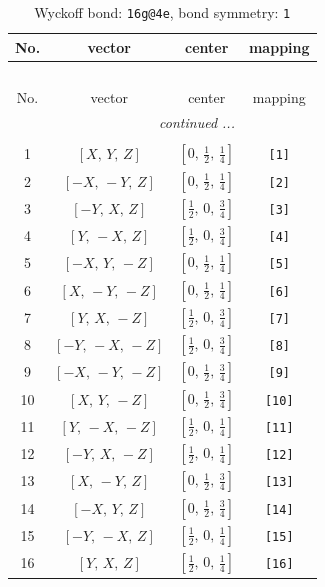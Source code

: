 \documentclass[fleqn,8pt]{jsarticle}
\begin{document}
\begin{longtable}{cccc}
\caption{Wyckoff bond: {\tt 16g@4e}, bond symmetry: {\tt 1}}
 \\
 \hline \hline
No. & vector & center & mapping \\ \hline \endfirsthead

\multicolumn{3}{l}{\tablename\ \thetable{}} \\
 \hline \hline
No. & vector & center & mapping \\ \hline \endhead

 \hline \hline
\multicolumn{3}{r}{\footnotesize\it continued ...} \\ \endfoot

 \hline \hline
\multicolumn{3}{r}{} \\ \endlastfoot

1 & $\left[ X,\, Y,\, Z \right]$ & $\left[ 0,\, \frac{1}{2},\, \frac{1}{4} \right]$ & {\tt [1]} \\ \hline
2 & $\left[ - X,\, - Y,\, Z \right]$ & $\left[ 0,\, \frac{1}{2},\, \frac{1}{4} \right]$ & {\tt [2]} \\ \hline
3 & $\left[ - Y,\, X,\, Z \right]$ & $\left[ \frac{1}{2},\, 0,\, \frac{3}{4} \right]$ & {\tt [3]} \\ \hline
4 & $\left[ Y,\, - X,\, Z \right]$ & $\left[ \frac{1}{2},\, 0,\, \frac{3}{4} \right]$ & {\tt [4]} \\ \hline
5 & $\left[ - X,\, Y,\, - Z \right]$ & $\left[ 0,\, \frac{1}{2},\, \frac{1}{4} \right]$ & {\tt [5]} \\ \hline
6 & $\left[ X,\, - Y,\, - Z \right]$ & $\left[ 0,\, \frac{1}{2},\, \frac{1}{4} \right]$ & {\tt [6]} \\ \hline
7 & $\left[ Y,\, X,\, - Z \right]$ & $\left[ \frac{1}{2},\, 0,\, \frac{3}{4} \right]$ & {\tt [7]} \\ \hline
8 & $\left[ - Y,\, - X,\, - Z \right]$ & $\left[ \frac{1}{2},\, 0,\, \frac{3}{4} \right]$ & {\tt [8]} \\ \hline
9 & $\left[ - X,\, - Y,\, - Z \right]$ & $\left[ 0,\, \frac{1}{2},\, \frac{3}{4} \right]$ & {\tt [9]} \\ \hline
10 & $\left[ X,\, Y,\, - Z \right]$ & $\left[ 0,\, \frac{1}{2},\, \frac{3}{4} \right]$ & {\tt [10]} \\ \hline
11 & $\left[ Y,\, - X,\, - Z \right]$ & $\left[ \frac{1}{2},\, 0,\, \frac{1}{4} \right]$ & {\tt [11]} \\ \hline
12 & $\left[ - Y,\, X,\, - Z \right]$ & $\left[ \frac{1}{2},\, 0,\, \frac{1}{4} \right]$ & {\tt [12]} \\ \hline
13 & $\left[ X,\, - Y,\, Z \right]$ & $\left[ 0,\, \frac{1}{2},\, \frac{3}{4} \right]$ & {\tt [13]} \\ \hline
14 & $\left[ - X,\, Y,\, Z \right]$ & $\left[ 0,\, \frac{1}{2},\, \frac{3}{4} \right]$ & {\tt [14]} \\ \hline
15 & $\left[ - Y,\, - X,\, Z \right]$ & $\left[ \frac{1}{2},\, 0,\, \frac{1}{4} \right]$ & {\tt [15]} \\ \hline
16 & $\left[ Y,\, X,\, Z \right]$ & $\left[ \frac{1}{2},\, 0,\, \frac{1}{4} \right]$ & {\tt [16]} \\
\end{longtable}
\end{document}

